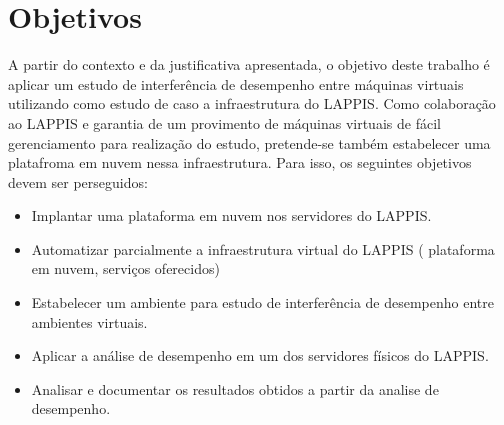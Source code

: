 \section{Objetivos}


A partir do contexto e da justificativa apresentada, o objetivo deste trabalho é aplicar um estudo de interferência de desempenho entre máquinas virtuais utilizando como estudo de caso a infraestrutura do LAPPIS. Como colaboração ao LAPPIS e garantia de um provimento de máquinas virtuais de fácil gerenciamento para realização do estudo, pretende-se também estabelecer uma platafroma em nuvem nessa infraestrutura. Para isso, os seguintes objetivos devem ser perseguidos: 

\begin{itemize}
\item Implantar uma plataforma em nuvem nos servidores do LAPPIS.
\item Automatizar parcialmente a infraestrutura virtual do LAPPIS ( plataforma em nuvem, serviços oferecidos)
\item Estabelecer um ambiente para estudo de interferência de desempenho entre ambientes virtuais.
\item Aplicar a análise de desempenho em um dos servidores físicos do LAPPIS.
\item Analisar e documentar os resultados obtidos a partir da analise de desempenho.


\end{itemize}

